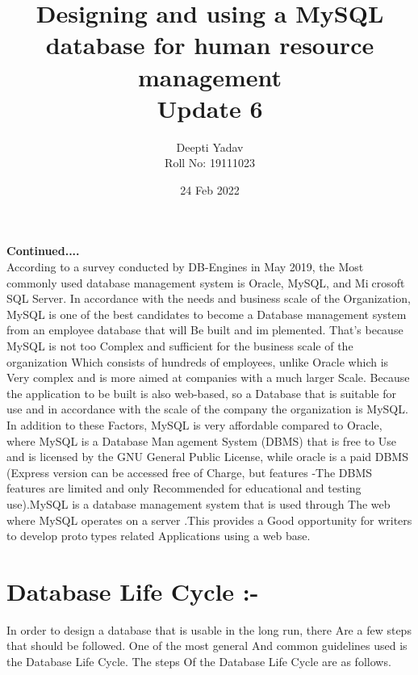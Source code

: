 \documentclass{article}
\title{ Designing and using a MySQL database for human resource management\\ Update 6}
\date{24 Feb 2022}
\author{Deepti Yadav\\ Roll No: 19111023 }
\begin{document}
\maketitle
\textbf{Continued....}
\\
According to a survey conducted by DB-Engines in May 2019, the Most
commonly used database management system is Oracle, MySQL, and Microsoft SQL Server. In accordance with the needs and business scale of the
Organization, MySQL is one of the best candidates to become a Database
management system from an employee database that will Be built and implemented. That’s because MySQL is not too Complex and sufficient for the
business scale of the organization Which consists of hundreds of employees,
unlike Oracle which is Very complex and is more aimed at companies with a
much larger Scale. Because the application to be built is also web-based, so
a Database that is suitable for use and in accordance with the scale of the
company the organization is MySQL. In addition to these Factors, MySQL
is very affordable compared to Oracle, where MySQL is a Database Management System (DBMS) that is free to Use and is licensed by the GNU
General Public License, while oracle is a paid DBMS (Express version can
be accessed free of Charge, but features -The DBMS features are limited and
only Recommended for educational and testing use).MySQL is a database
management system that is used through The web where MySQL operates
on a server .This provides a Good opportunity for writers to develop prototypes related Applications using a web base.
\section*{Database Life Cycle :-
}
In order to design a database that is usable in the long run, there Are a
few steps that should be followed. One of the most general And common
guidelines used is the Database Life Cycle. The steps Of the Database Life
Cycle are as follows.
\end{document}
